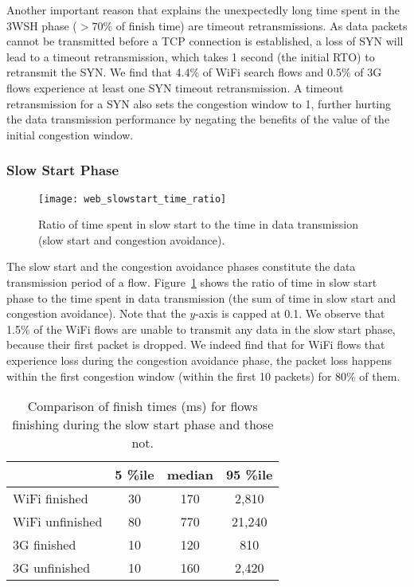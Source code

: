 Another important reason that explains the unexpectedly long time spent in the 3WSH phase (\ie $>70\%$ of finish time) are timeout retransmissions. As data packets cannot be transmitted before a TCP connection is established, a loss of SYN will lead to a timeout retransmission, which takes 1 second (\ie the initial RTO) to retransmit the SYN. We find that 4.4\% of WiFi search flows and 0.5\% of 3G flows experience at least one SYN timeout retransmission. A timeout retransmission for a SYN also sets the congestion window to 1, further hurting the data transmission performance by negating the benefits of the value of the initial congestion window. 

\subsubsection{Slow Start Phase}

\begin{figure}[th]
\centering
\texttt{[image: web\_slowstart\_time\_ratio]}
\caption{Ratio of time spent in slow start to the time in data transmission (slow start and congestion avoidance).}
\label{fig:web_ss_time_ratio}
\end{figure}

The slow start and the congestion avoidance phases constitute the data transmission period of a flow. Figure~\ref{fig:web_ss_time_ratio} shows the ratio of time in slow start phase to the time spent in data transmission (\ie the sum of time in slow start and congestion avoidance). Note that the $y$-axis is capped at 0.1. We observe that 1.5\% of the WiFi flows are unable to transmit any data in the slow start phase, because their first packet is dropped. We indeed find that for WiFi flows that experience loss during the congestion avoidance phase, the packet loss happens within the first congestion window (\ie within the first 10 packets) for 80\% of them.

\begin{table}[th]
\caption{Comparison of finish times (ms) for flows finishing during the slow start phase and those not.}
\label{tab:web_finish_time_3rd_phase}
\centering
\renewcommand{\arraystretch}{1.0}

\begin{tabular}{l|c|c|c}
\hline
& 5 \%ile & median & 95 \%ile \\
\hline
WiFi finished & 30 & 170 & 2,810 \\
WiFi unfinished & 80 & 770 & 21,240 \\

\hline
3G finished & 10 & 120 & 810 \\
3G unfinished & 10 & 160 & 2,420 \\

\hline
\end{tabular}
\end{table}

